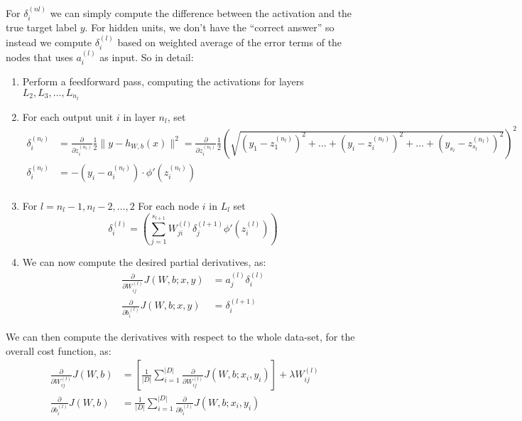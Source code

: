     For $\delta_i^{(nl)}$ we can simply compute the difference between the 
    activation and the true target label $y$. For hidden units, we don't have 
    the ``correct answer'' so instead we compute $\delta_i^{(l)}$ based on 
    weighted average of the error terms of the nodes that uses $a_i^{(l)}$ as 
    input. So in detail:
    
    \begin{enumerate}
        \item Perform a feedforward pass, computing the activations for layers 
        $L_2,L_3,\dots,L_{n_l}$
        \item For each output unit $i$ in layer $n_l$, set
        \begin{align*}
            \delta_i^{(n_l)} &= \frac{\partial}{\partial z_i^{(n_l)}} 
            \frac{1}{2}\|y-h_{W,b}(x)\|^2 = \frac{\partial}{\partial 
            z_i^{(n_l)}} \frac{1}{2}
            \left(\sqrt{(y_1-z_1^{(n_l)})^2+\dots+
                (y_i-z_i^{(n_l)})^2+\dots+
                (y_{s_l}-z_{s_l}^{(n_l)})^2}\right)^2\\
            \delta_i^{(n_l)} &= -(y_i - a_i^{(n_l)}) \cdot 
            \phi'(z_i^{(n_l)})\\
        \end{align*}
        \item For $l=n_l-1, n_l-2,\dots, 2$
            For each node $i$ in $L_l$ set
            \begin{equation*}
                \delta_i^{(l)}=\left(\sum_{j=1}^{s_{l+1}}W_{ji}^{(l)}\delta_j^{(l+1)}\phi'(z_i^{(l)})\right)
            \end{equation*}
        \item We can now compute the desired partial derivatives, as:
        \begin{align*}
            \frac{\partial}{\partial W_{ij}^{(l)}}J(W,b;x,y) &= 
            a_j^{(l)}\delta_i^{(l)}\\
            \frac{\partial}{\partial b_i^{(l)}}J(W,b;x,y) &= \delta_i^{(l+1)}
        \end{align*}
    \end{enumerate}
    We can then compute the derivatives with respect to the whole data-set, for 
    the overall cost function, as:
    \begin{align*}
        \frac{\partial}{\partial W_{ij}^{(l)}} J(W,b) &= 
        \left[\frac{1}{|D|}\sum_{i=1}^{|D|}\frac{\partial}{\partial 
        W_{ij}^{(l)}} J(W,b;x_i,y_i)\right] + \lambda W_{ij}^{(l)}\\
        \frac{\partial}{\partial b_i^{(l)}} J(W,b) &= 
        \frac{1}{|D|}\sum_{i=1}^{|D|} \frac{\partial}{\partial b_i^{(l)}} 
        J(W,b;x_i, y_i)
    \end{align*}
    
